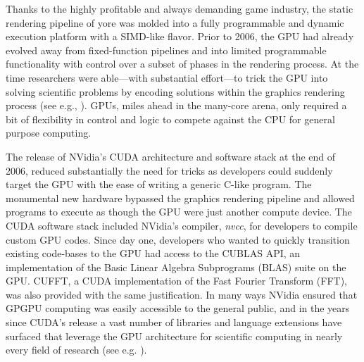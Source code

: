 \documentclass{report}
\begin{document}
Thanks to the highly profitable and always demanding game industry, the static rendering pipeline of yore was molded into a fully programmable and dynamic execution platform with a SIMD-like flavor. Prior to 2006, the GPU had already evolved away from fixed-function pipelines and into limited programmable functionality with control over a subset of phases in the rendering process. At the time researchers were able---with substantial effort---to trick the GPU into solving scientific problems by encoding solutions within the graphics rendering process (see e.g., \cite{Trendall2000,Jansen2007,Harris2005,Owens2007}).
GPUs, miles ahead in the many-core arena, only required a bit of flexibility in control and logic to compete against the CPU for general purpose computing.  

The release of NVidia's CUDA architecture and software stack \cite{CudaGuide2013} at the end of 2006, reduced substantially the need for tricks as developers could suddenly target the GPU with the ease of writing a generic C-like program. The monumental new hardware bypassed the graphics rendering pipeline and allowed programs to execute as though the GPU were just another compute device. The CUDA software stack included NVidia's compiler, \emph{nvcc}, for developers to compile custom GPU codes. Since day one, developers who wanted to quickly transition existing code-bases to the GPU had access to the CUBLAS API, an implementation of the Basic Linear Algebra Subprograms (BLAS) suite on the GPU. CUFFT, a CUDA implementation of the Fast Fourier Transform (FFT), was also provided with the same justification. In many ways NVidia ensured that GPGPU computing was easily accessible to the general public, and in the years since CUDA's release a vast number of libraries and language extensions have surfaced that leverage the GPU architecture for scientific computing in nearly every field of research (see e.g. \cite{NVidiaExamples}). 
\end{document}
